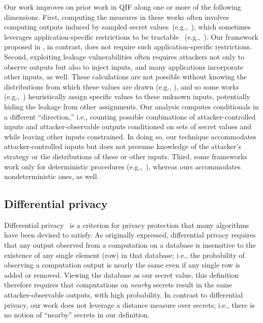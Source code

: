 Our work improves on prior work in \gls{QIF} along one or more of the
following dimensions.  First, computing the measures in these works
often involves computing outputs induced by sampled secret
values~(e.g.,~\cite{Clark:2007:SAQ}), which sometimes leverages
application-specific restrictions to be tractable
~(e.g.,~\cite{sidebuster:ccs10}).  Our framework proposed in
, in contrast, does not require such
application-specific restrictions.  Second, exploiting leakage
vulnerabilities often requires attackers not only to observe outputs
but also to inject inputs, and many applications incorporate other
inputs, as well.  These \QIF calculations are not possible without
knowing the distributions from which these values are drawn (e.g.,
\cite{mardziel2014quantifying}), and so some works
(e.g.,~\cite{Kopf:2007:IMA:1315245.1315282,Pasareanu:CSF:2016})
heuristically assign specific values to these unknown inputs,
potentially hiding the leakage from other assignments.  Our analysis
computes conditionals in a different ``direction,'' i.e., counting
possible combinations of attacker-controlled inputs and
attacker-observable outputs conditioned on sets of secret values and
while leaving other inputs constrained. In doing so, our technique
accommodates attacker-controlled inputs but does not presume knowledge
of the attacker's strategy or the distributions of these or other
inputs.  Third, some \QIF frameworks work only for deterministic
procedures (e.g.,~\cite{cryptoeprint:2017:401,randQIF}), whereas ours
accommodates nondeterministic ones, as well. 

\subsection{Differential privacy}

Differential privacy~\cite{dp} is a criterion for privacy protection
that many algorithms have been devised to satisfy.  As originally
expressed, differential privacy requires that any output observed from
a computation on a database is insensitive to the existence of any
single element (row) in that database; i.e., the probability of
observing a computation output is nearly the same even if any single
row is added or removed.  Viewing the database as our secret value,
this definition therefore requires that computations on
\textit{nearby} secrets result in the same attacker-observable
outputs, with high probability.  In contrast to differential privacy,
our work does not leverage a distance measure over secrets; i.e.,
there is no notion of ``nearby'' secrets in our definition.

